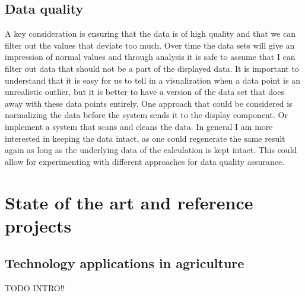 \documentclass[]{uiophd}
\begin{document}
\section{Data quality}
A key consideration is ensuring that the data is of high quality and that we can filter out the values that deviate too much. Over time the data sets will give an impression of normal values and through analysis it is safe to assume that I can filter out data that should not be a part of the displayed data. It is important to understand that it is easy for us to tell in a visualization when a data point is an unrealistic outlier, but it is better to have a version of the data set that does away with these data points entirely. One approach that could be considered is normalizing the data before the system sends it to the display component. Or implement a system that scans and cleans the data. In general I am more interested in keeping the data intact, as one could regenerate the same result again as long as the underlying data of the calculation is kept intact. This could allow for experimenting with different approaches for data quality assurance.

\chapter{State of the art and reference projects}

\section{Technology applications in agriculture}
TODO INTRO!!
\end{document}
